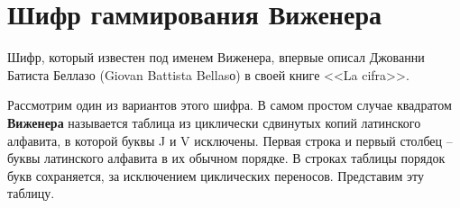 \section{Шифр гаммирования Виженера}

Шифр, который известен под именем Виженера, впервые описал Джованни Батиста Беллазо (Giovan Battista Bellasо) в своей книге <<La cifra>>.

Рассмотрим один из вариантов этого шифра. В самом простом случае квадратом \textbf{Виженера}  называется таблица из циклически сдвинутых копий латинского алфавита, в которой буквы J и V исключены. Первая строка и первый столбец -- буквы латинского алфавита в их обычном порядке. В строках таблицы порядок букв сохраняется, за исключением циклических переносов. Представим эту таблицу.

